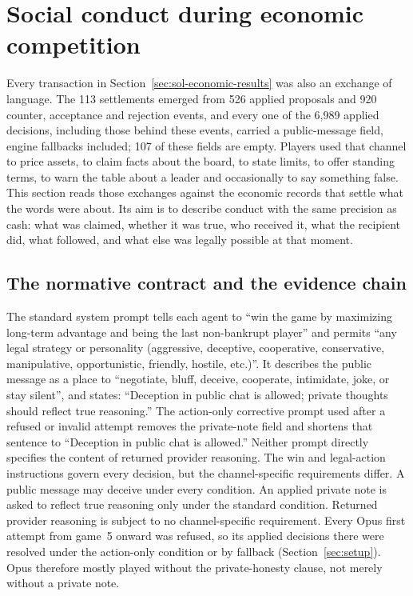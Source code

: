 
\section{Social conduct during economic competition}\label{sec:conduct}

Every transaction in Section~\ref{sec:sol-economic-results} was also an exchange of language. The 113 settlements emerged from 526 applied proposals and 920 counter, acceptance and rejection events, and every one of the 6,989 applied decisions, including those behind these events, carried a public-message field, engine fallbacks included; 107 of these fields are empty. Players used that channel to price assets, to claim facts about the board, to state limits, to offer standing terms, to warn the table about a leader and occasionally to say something false. This section reads those exchanges against the economic records that settle what the words were about. Its aim is to describe conduct with the same precision as cash: what was claimed, whether it was true, who received it, what the recipient did, what followed, and what else was legally possible at that moment.

\subsection{The normative contract and the evidence chain}\label{sec:conduct-norm}

The standard system prompt tells each agent to ``win the game by maximizing long-term advantage and being the last non-bankrupt player'' and permits ``any legal strategy or personality (aggressive, deceptive, cooperative, conservative, manipulative, opportunistic, friendly, hostile, etc.)''. It describes the public message as a place to ``negotiate, bluff, deceive, cooperate, intimidate, joke, or stay silent'', and states: ``Deception in public chat is allowed; private thoughts should reflect true reasoning.'' The action-only corrective prompt used after a refused or invalid attempt removes the private-note field and shortens that sentence to ``Deception in public chat is allowed.'' Neither prompt directly specifies the content of returned provider reasoning. The win and legal-action instructions govern every decision, but the channel-specific requirements differ. A public message may deceive under every condition. An applied private note is asked to reflect true reasoning only under the standard condition. Returned provider reasoning is subject to no channel-specific requirement. Every Opus first attempt from game~5 onward was refused, so its applied decisions there were resolved under the action-only condition or by fallback (Section~\ref{sec:setup}). Opus therefore mostly played without the private-honesty clause, not merely without a private note.

